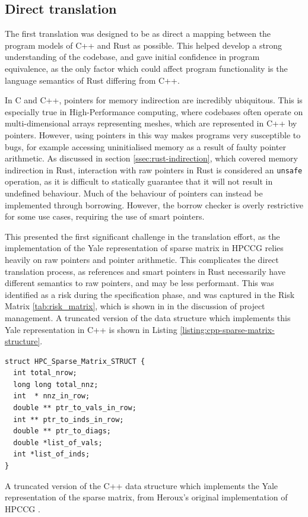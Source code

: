 \subsection{Direct translation}
\label{sec:translation-direct}
The first translation was designed to be as direct a mapping between the program models of C++ and Rust as possible. This helped develop a strong understanding of the codebase, and gave initial confidence in program equivalence, as the only factor which could affect program functionality is the language semantics of Rust differing from C++.

In C and C++, pointers for memory indirection are incredibly ubiquitous. This is especially true in High-Performance computing, where codebases often operate on multi-dimensional arrays representing meshes, which are represented in C++ by pointers. However, using pointers in this way makes programs very susceptible to bugs, for example accessing uninitialised memory as a result of faulty pointer arithmetic. As discussed in section \ref{ssec:rust-indirection}, which covered memory indirection in Rust, interaction with raw pointers in Rust is considered an \texttt{unsafe} operation, as it is difficult to statically guarantee that it will not result in undefined behaviour. Much of the behaviour of pointers can instead be implemented through borrowing. However, the borrow checker is overly restrictive for some use cases, requiring the use of smart pointers.

This presented the first significant challenge in the translation effort, as the implementation of the Yale representation of sparse matrix in HPCCG relies heavily on raw pointers and pointer arithmetic. This complicates the direct translation process, as references and smart pointers in Rust necessarily have different semantics to raw pointers, and may be less performant. This was identified as a risk during the specification phase, and was captured in the Risk Matrix \ref{tab:risk_matrix}, which is shown in  in the discussion of project management. A truncated version of the data structure which implements this Yale representation in C++ is shown in Listing \ref{listing:cpp-sparse-matrix-structure}.

\begin{listing}[H]
    \begin{verbatim}
struct HPC_Sparse_Matrix_STRUCT {
  int total_nrow;
  long long total_nnz;
  int  * nnz_in_row;
  double ** ptr_to_vals_in_row;
  int ** ptr_to_inds_in_row;
  double ** ptr_to_diags;
  double *list_of_vals;
  int *list_of_inds;
}
    \end{verbatim}
    \caption{A truncated version of the C++ data structure which implements the Yale representation of the sparse matrix, from Heroux's original implementation of HPCCG \cite{MantevoHPCCG2023}.}
    \label{listing:cpp-sparse-matrix-structure}
\end{listing}

